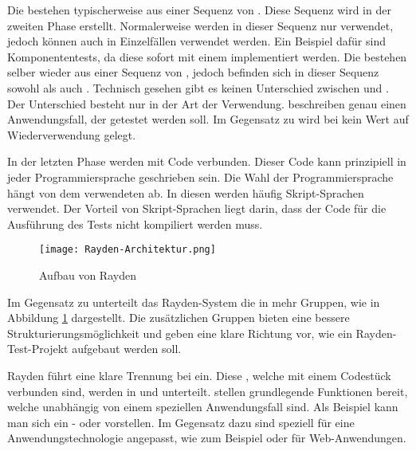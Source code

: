 \SuperPar
Die  bestehen typischerweise aus einer Sequenz von . Diese Sequenz wird in der zweiten Phase erstellt. Normalerweise werden in dieser Sequenz nur  verwendet, jedoch können auch in Einzelfällen  verwendet werden. Ein Beispiel dafür sind Komponententests, da diese sofort mit einem  implementiert werden.  Die  bestehen selber wieder aus einer Sequenz von , jedoch befinden sich in dieser Sequenz sowohl  als auch . Technisch gesehen gibt es keinen Unterschied zwischen  und . Der Unterschied besteht nur in der Art der Verwendung.  beschreiben genau einen Anwendungsfall, der getestet werden soll. Im Gegensatz zu  wird bei  kein Wert auf Wiederverwendung gelegt.

\SuperPar
In der letzten Phase werden  mit Code verbunden. Dieser Code kann prinzipiell in jeder Programmiersprache geschrieben sein. Die Wahl der Programmiersprache hängt von dem verwendeten  ab. In diesen  werden häufig Skript-Sprachen verwendet. Der Vorteil von Skript-Sprachen liegt darin, dass der Code für die Ausführung des Tests nicht kompiliert werden muss.

\begin{figure}[h]
\centering
\texttt{[image: Rayden-Architektur.png]}
\caption{Aufbau von Rayden}
\label{fig:rayden-arch}
\end{figure}

\SuperPar
Im Gegensatz zu  unterteilt das Rayden-System die  in mehr Gruppen, wie in Abbildung \ref{fig:rayden-arch} dargestellt. Die zusätzlichen Gruppen bieten eine bessere Strukturierungsmöglichkeit und geben eine klare Richtung vor, wie ein Rayden-Test-Projekt aufgebaut werden soll.    

\SuperPar
Rayden führt eine klare Trennung bei  ein. Diese , welche mit einem Codestück verbunden sind, werden in  und  unterteilt.  stellen grundlegende Funktionen bereit, welche unabhängig von einem speziellen Anwendungsfall sind. Als Beispiel kann man sich ein - oder  vorstellen. Im Gegensatz dazu sind  speziell für eine Anwendungstechnologie angepasst, wie zum Beispiel  oder  für Web-Anwendungen. 

